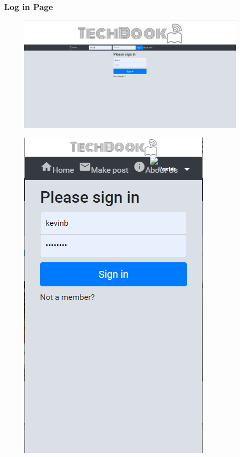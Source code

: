 \subsubsection{Log in Page}
\begin{figure}[H]
\centering
\begin{minipage}{.75\textwidth}
  \centering
  \includegraphics[width=.9\linewidth]{img/ui/login_PC.PNG}
  \label{fig:loginPC}
\end{minipage}%
\begin{minipage}{.25\textwidth}
  \centering
  \includegraphics[width=.9\linewidth]{img/ui/login_MOBILE.PNG}
  \label{fig:loginMOBILE}
\end{minipage}
\end{figure}

